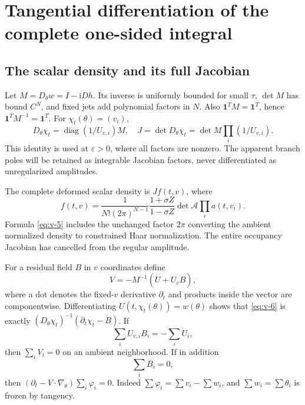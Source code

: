 \documentclass[11pt]{article}
\numberwithin{equation}{section}
\theoremstyle{remark}\newtheorem{remark}[theorem]{Remark}
\newcommand{\ii}{\mathrm i}
\begin{document}
\section{Tangential differentiation of the complete one-sided integral}\label{sec:constrained-transport}\label{sec:global-transport}\subsection{The scalar density and its full Jacobian}

Let $M=D_\theta w=I-\ii Dh$. Its inverse is uniformly bounded for
small $\tau$, $\det M$ has bound $C^N$, and fixed jets add polynomial
factors in $N$. Also $\boldsymbol1^TM=\boldsymbol1^T$, hence
$\boldsymbol1^TM^{-1}=\boldsymbol1^T$. For
$\chi_t(\theta)=(v_i)$,
\begin{equation}\label{eq:v-4}
D_\theta\chi_t=\operatorname{diag}(1/U_{v,i})M,
 \quad J=\det D_\theta\chi_t
       =\det M\prod_i(1/U_{v,i}).
\end{equation}
This identity is used at $\varepsilon>0$, where all factors are
nonzero. The apparent branch poles will be retained as integrable
Jacobian factors, never differentiated as unregularized amplitudes.

The complete deformed scalar density is $J f(t,v)$, where
\begin{equation}\label{eq:v-5}
f(t,v)=\frac1{N!(2\pi)^{N-1}}
 \frac{1+\sigma Z}{1-\sigma Z}\det\mathcal A\prod_i a(t,v_i).
\end{equation}
Formula \eqref{eq:v-5} includes the unchanged factor $2\pi$ converting the
ambient normalized density to constrained Haar normalization. The
entire occupancy Jacobian has cancelled from the regular amplitude.

For a residual field $B$ in $v$ coordinates define
\begin{equation}\label{eq:v-6}
V=-M^{-1}(\dot U+U_v B),
\end{equation}
where a dot denotes the fixed-$v$ derivative $\partial_t$ and products
inside the vector are componentwise. Differentiating
$U(t,\chi_t(\theta))=w(\theta)$ shows that \eqref{eq:v-6} is exactly
$(D_\theta\chi_t)^{-1}(\partial_t\chi_t-B)$.
If
\begin{equation}\label{eq:v-7}
\sum_i U_{v,i}B_i=-\sum_i\dot U_i,
\end{equation}
then $\sum_iV_i=0$ on an ambient neighborhood. If in addition
\begin{equation}\label{eq:v-8}
\sum_iB_i=0,
\end{equation}
then $(\partial_t-V\cdot\nabla_\theta)\sum_i\varphi_i=0$.
Indeed $\sum\varphi_i=\sum v_i-\sum w_i$, and
$\sum w_i=\sum\theta_i$ is frozen by tangency.
\end{document}
